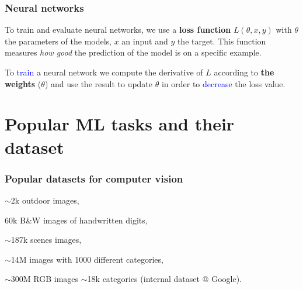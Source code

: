 \documentclass[10pt]{beamer}
\begin{document}
\begin{frame}
  \frametitle{Neural networks}

  \begin{center}
    \scalebox{0.4}{
      
    }
  \end{center}

  To train and evaluate neural networks, we use a \textbf{loss
    function} $L(\theta, x, y)$ with $\theta$ the parameters of the
  models, $x$ an input and $y$ the target. This function measures
  \emph{how good} the prediction of the model is on a specific
  example.

  \bigskip

  To \textcolor{blue}{train} a neural network we compute the
  derivative of $L$ according to \textbf{the weights} ($\theta$) and
  use the result to update $\theta$ in order to
  \textcolor{blue}{decrease} the loss value.
\end{frame}

\section{Popular ML tasks and their dataset}

\begin{frame}

  \frametitle{Popular datasets for computer vision}

  \begin{description}[labelwidth=\widthof{bf series 2017, JFT-300M}]
    \setlength{\itemsep}{8pt}
    \item[1990, Statlog] $\sim$2k outdoor images,
    \item[1998, MNIST] 60k B\&W images of handwritten digits,
    \item[2005, LabelMe] $\sim$187k scenes images,
    \item[2009, ImageNet] $\sim$14M images with 1000 different categories,
    \item[2017, JFT-300M] $\sim$300M RGB images $\sim$18k categories (internal dataset @ Google).
  \end{description}

\end{frame}
\end{document}
